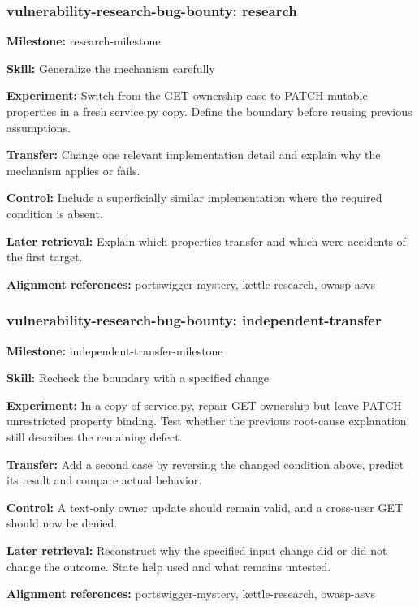 \subsubsection{vulnerability-research-bug-bounty: research}
\noindent\textbf{Milestone:} research-milestone\par
\noindent\textbf{Skill:} Generalize the mechanism carefully\par
\noindent\textbf{Experiment:} Switch from the GET ownership case to PATCH mutable properties in a fresh service.py copy. Define the boundary before reusing previous assumptions.\par
\noindent\textbf{Transfer:} Change one relevant implementation detail and explain why the mechanism applies or fails.\par
\noindent\textbf{Control:} Include a superficially similar implementation where the required condition is absent.\par
\noindent\textbf{Later retrieval:} Explain which properties transfer and which were accidents of the first target.\par
\noindent\textbf{Alignment references:} portswigger-mystery, kettle-research, owasp-asvs\par
\subsubsection{vulnerability-research-bug-bounty: independent-transfer}
\noindent\textbf{Milestone:} independent-transfer-milestone\par
\noindent\textbf{Skill:} Recheck the boundary with a specified change\par
\noindent\textbf{Experiment:} In a copy of service.py, repair GET ownership but leave PATCH unrestricted property binding. Test whether the previous root-cause explanation still describes the remaining defect.\par
\noindent\textbf{Transfer:} Add a second case by reversing the changed condition above, predict its result and compare actual behavior.\par
\noindent\textbf{Control:} A text-only owner update should remain valid, and a cross-user GET should now be denied.\par
\noindent\textbf{Later retrieval:} Reconstruct why the specified input change did or did not change the outcome. State help used and what remains untested.\par
\noindent\textbf{Alignment references:} portswigger-mystery, kettle-research, owasp-asvs\par
